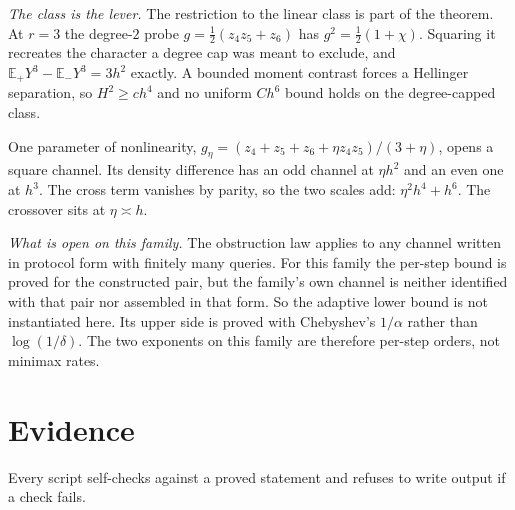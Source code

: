 \emph{The class is the lever.} The restriction to the linear class is part of the theorem. At
$r=3$ the degree-$2$ probe $g=\frac12(z_{4}z_{5}+z_{6})$ has $g^{2}=\frac12(1+\chi)$. Squaring it
recreates the character a degree cap was meant to exclude, and
$\mathbb{E}_{+}Y^{3}-\mathbb{E}_{-}Y^{3}=3h^{2}$ exactly. \CERT{} A bounded moment contrast forces a
Hellinger separation, so $H^{2}\ge ch^{4}$ and no uniform $Ch^{6}$ bound holds on the
degree-capped class.

 One parameter of nonlinearity,
$g_{\eta}=(z_{4}+z_{5}+z_{6}+\eta z_{4}z_{5})/(3+\eta)$, opens a square channel. Its density
difference has an odd channel at $\eta h^{2}$ and an even one at $h^{3}$. The cross term
vanishes by parity, so the two scales add: $\eta^{2}h^{4}+h^{6}$. The crossover sits at
$\eta\asymp h$.


\emph{What is open on this family.} The obstruction law applies to any channel written in
protocol form with finitely many queries. For this family the per-step bound is proved for the
constructed pair, but the family's own channel is neither identified with that pair nor
assembled in that form. So the adaptive lower bound is not instantiated here.
Its upper side is proved with Chebyshev's $1/\alpha$ rather than $\log(1/\delta)$. The two
exponents on this family are therefore per-step orders, not minimax rates.


\section{Evidence}
\label{sec:evidence}

Every script self-checks against a proved statement and refuses to write output if a check
fails.

